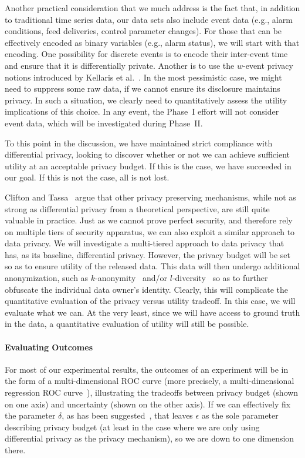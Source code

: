 Another practical consideration that we much address is the fact that, in
addition to traditional time series data, our data sets also include
event data (e.g., alarm conditions, feed deliveries, control parameter
changes).  For those that can be effectively encoded as binary variables
(e.g., alarm status), we will start with that encoding.
One possibility for discrete events is to encode their inter-event time
and ensure that it is differentially private.
Another is to use the $w$-event privacy notions introduced by
Kellaris et al.~\cite{Kellaris14}.
In the most pessimistic case, we might need to suppress some raw data,
if we cannot ensure its disclosure maintains privacy.  In such a situation,
we clearly need to quantitatively assess the utility implications
of this choice.
In any event, the Phase~I effort will not consider event data, which will
be investigated during Phase~II. 

To this point in the discussion, we have maintained strict compliance
with differential privacy, looking to discover whether or not we can
achieve sufficient utility at an acceptable privacy budget.  If this is
the case, we have succeeded in our goal.  If this is not the case, all
is not lost.

Clifton and Tassa~\cite{ct13} argue that other privacy preserving
mechanisms, while not as strong as differential privacy from a
theoretical perspective, are still quite valuable in practice.
Just as we cannot prove perfect security, and therefore rely on multiple
tiers of security apparatus, we can also exploit a similar approach
to data privacy.  We will investigate a multi-tiered approach to data
privacy that has, as its baseline, differential privacy.  However,
the privacy budget will be set so as to ensure utility of the released
data.  This data will then undergo additional anonymization, such as
$k$-anonymity~\cite{samarati01,sweeney02}
and/or $l$-diversity~\cite{mkgv07} so as to further
obfuscate the individual data owner's identity.
Clearly, this will complicate the quantitative evaluation of the
privacy versus utility tradeoff. In this case, we will evaluate what we
can.  At the very least, since we will have access to ground truth in
the data, a quantitative evaluation of utility will still be possible.

\paragraph{Evaluating Outcomes}
For most of our experimental results, the outcomes of an experiment
will be in the form of a multi-dimensional ROC curve
(more precisely, a multi-dimensional
regression ROC curve~\cite{Fawcett06,HO13,Mossman99}), illustrating
the tradeoffs between privacy budget (shown on one axis) and uncertainty
(shown on the other axis). If we can effectively fix the parameter $\delta$,
as has been suggested~\cite{dr14}, that leaves $\epsilon$ as the
sole parameter describing privacy budget (at least in the case where
we are only using differential privacy as the privacy mechanism), so we
are down to one dimension there.

